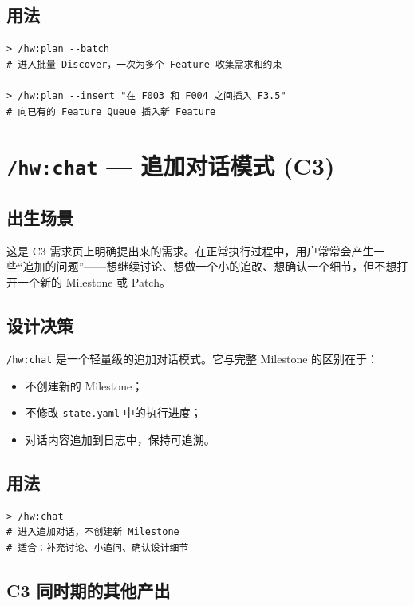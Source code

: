 \documentclass[
  outputdir=build,
  chapterstyle=cn,
  colorscheme=Simple,
  fontset=tech,
  code=false
]{Hypo-Note}
\begin{document}
\subsection{用法}

\begin{lstlisting}[caption=批量规划]
> /hw:plan --batch
# 进入批量 Discover，一次为多个 Feature 收集需求和约束

> /hw:plan --insert "在 F003 和 F004 之间插入 F3.5"
# 向已有的 Feature Queue 插入新 Feature
\end{lstlisting}

\section{\texttt{/hw:chat} — 追加对话模式 (C3)}

\subsection{出生场景}

这是 C3 需求页上明确提出来的需求。在正常执行过程中，用户常常会产生一些“追加的问题”——想继续讨论、想做一个小的追改、想确认一个细节，但不想打开一个新的 Milestone 或 Patch。

\subsection{设计决策}

\texttt{/hw:chat} 是一个轻量级的追加对话模式。它与完整 Milestone 的区别在于：

\begin{itemize}[leftmargin=2em]
  \item 不创建新的 Milestone；
  \item 不修改 \texttt{state.yaml} 中的执行进度；
  \item 对话内容追加到日志中，保持可追溯。
\end{itemize}

\subsection{用法}

\begin{lstlisting}[caption=进入轻量讨论模式]
> /hw:chat
# 进入追加对话，不创建新 Milestone
# 适合：补充讨论、小追问、确认设计细节
\end{lstlisting}

\subsection{C3 同时期的其他产出}
\end{document}
